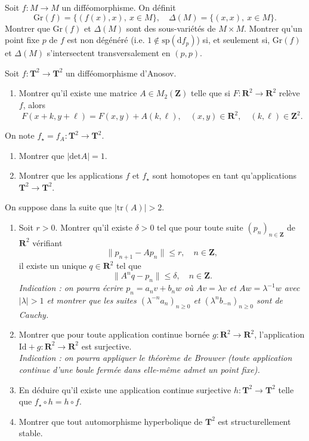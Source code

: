 \documentclass[a4paper,10pt,openany]{article}
\theoremstyle{plain}
\theoremstyle{definition}
\newcommand{\dd}{\mathrm{d}}
\newcommand{\T}{\mathbf{T}}
\newcommand{\R}{\mathbf{R}}
\newcommand{\Z}{\mathbf{Z}}
\newcommand{\Id}{\mathrm{Id}}
\begin{document}
\noindent Soit $f : M \to M$ un diff\'eomorphisme. On d\'efinit
$$
\mathrm{Gr}(f) = \{(f(x), x),~x \in M\}, \quad \Delta(M) = \{(x,x), ~ x \in M\}.
$$
Montrer que  $\mathrm{Gr}(f)$ et $\Delta(M)$ sont des sous-vari\'et\'es de $M\times M$. Montrer qu'un point fixe $p$ de $f$ est non d\'eg\'en\'er\'e (i.e. $1 \notin \mathrm{sp}(\dd f_p)$) si, et seulement si, $\mathrm{Gr}(f)$ et $\Delta(M)$ s'intersectent transversalement en $(p,p)$.

\vspace{0.6cm}

 \vspace{1.5mm} 

\noindent Soit $f : \T^2 \to \T^2$ un diff\'eomorphisme d'Anosov.

\begin{enumerate}
\item Montrer qu'il existe une matrice $A \in M_2(\Z)$ telle que si $F : \R^2 \to \R^2$ rel\`eve $f$, alors
$$
F(x + k, y+\ell) = F(x,y) + A (k, \ell), \quad (x,y) \in \R^2, \quad (k,\ell) \in \Z^2.
$$
\end{enumerate}
On note $f_\star = f_A : \T^2 \to \T^2$.
\begin{enumerate}[resume]
\item Montrer que $\vert \mathrm{det} A \vert = 1.$
\item Montrer que les applications $f$ et $f_\star$ sont homotopes en tant qu'applications $\T^2 \to \T^2$.
\end{enumerate}
On suppose dans la suite que $|\mathrm{tr}(A)|>2$.
\begin{enumerate}[resume]
\item \label{item:shadow} Soit $r>0$. Montrer qu'il existe $\delta > 0$ tel que pour toute suite $(p_n)_{n \in \Z}$ de $\R^2$ v\'erifiant
$$
\|p_{n+1} - A p_n\| \leq r, \quad n \in \Z,
$$
il existe un unique $q \in \R^2$ tel que 
$$
\|A^nq- p_n\| \leq \delta, \quad n \in \Z.
$$
\textit{Indication : on pourra \'ecrire $p_n = a_n v + b_n w$ o\`u $Av = \lambda v$ et $Aw = \lambda^{-1}w$ avec $|\lambda| > 1$ et montrer que les suites $(\lambda^{-n} a_n)_{n \geqslant 0}$ et $(\lambda^nb_{-n})_{n \geqslant 0}$ sont de Cauchy.}
\item Montrer que pour toute application continue born\'ee $g : \R^2 \to \R^2$, l'application $\Id + g : \R^2 \to \R^2$ est surjective. \\
\textit{Indication : on pourra appliquer le th\'eor\`eme de Brouwer (toute application continue d'une boule ferm\'ee dans elle-m\^eme admet un point fixe).}
\item En d\'eduire qu'il existe une application continue surjective $h : \T^2 \to \T^2$ telle que $f_\star \circ h = h \circ f$.
\item Montrer que tout automorphisme hyperbolique de $\T^2$ est structurellement stable.
\end{enumerate}
\end{document}
